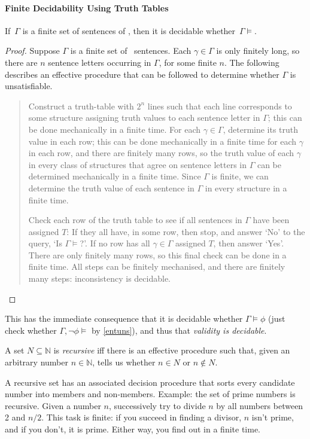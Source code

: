 \paragraph{Finite Decidability Using Truth Tables}
\begin{theorem}\label{findec}
	If\, $\Gamma$ is a finite set of sentences of \lone, then it is decidable whether\, $\Gamma \vDash$.
	\begin{proof}
Suppose $\Gamma$ is a finite set of \lone\ sentences. Each $\gamma\in\Gamma$ is only finitely long, so there are $n$ sentence letters occurring in $\Gamma$, for some finite $n$. The following describes an effective procedure that can be followed to determine whether $\Gamma$ is unsatisfiable. \begin{quote}
	Construct a truth-table with $2^{n}$ lines such that each line corresponds to some structure assigning truth values to each sentence letter in $\Gamma$; this can be done mechanically in a finite time. For each $\gamma \in \Gamma$, determine its truth value in each row; this can be done mechanically in a finite time for each $\gamma$ in each row, and there are finitely many rows, so the truth value of each $\gamma$ in every class of structures that agree on sentence letters in $\Gamma$ can be determined mechanically in a finite time. Since $\Gamma$ is finite, we can determine the truth value of each sentence in $\Gamma$ in every structure in a finite time. 

	Check each row of the truth table to see if all sentences in $\Gamma$ have been assigned $T$: If they all have, in some row, then stop, and answer `No' to the query, `Is $\Gamma\vDash$?'. If no row has all $\gamma\in\Gamma$ assigned $T$, then answer `Yes'. There are only finitely many rows, so this final check can be done in a finite time. All steps can be finitely mechanised, and there are finitely many steps: inconsistency is decidable.
		\end{quote}
	\end{proof}
\end{theorem}

This has the immediate consequence that it is decidable whether $\Gamma\vDash\phi$ (just check whether $\Gamma,\neg\phi\vDash$ by \autoref{entuns}), and thus that \emph{validity is decidable}.

\begin{definition}[Recursivity]
	A set $N \subseteq \mathbb{N}$ is \emph{recursive} iff there is an effective procedure such that, given an arbitrary number $n \in \mathbb{N}$, tells us whether $n\in N$ or $n\notin N$.
\end{definition} A recursive set has an associated decision procedure that sorts every candidate number into members and non-members. Example: the set of prime numbers is recursive. Given a number $n$, successively try to divide $n$ by all numbers between 2 and $n/2$. This task is finite: if you succeed in finding a divisor, $n$ isn't prime, and if you don't, it is prime. Either way, you find out in a finite time.


